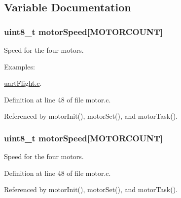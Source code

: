 \subsection{Variable Documentation}
\hypertarget{group__motor_ga0b3c12451554c9ee060319cbe2553d3a}{
\subsubsection[{motor\-Speed}]{\setlength{\rightskip}{0pt plus 5cm}uint8\-\_\-t motor\-Speed\mbox{[}{\bf M\-O\-T\-O\-R\-C\-O\-U\-N\-T}\mbox{]}}}\label{group__motor_ga0b3c12451554c9ee060319cbe2553d3a}


Speed for the four motors. 

\begin{Desc}
\item[Examples\-: ]\par
\hyperlink{uart_flight_8c-example}{uart\-Flight.\-c}.\end{Desc}


Definition at line 48 of file motor.\-c.



Referenced by motor\-Init(), motor\-Set(), and motor\-Task().

\hypertarget{group__motor_ga0b3c12451554c9ee060319cbe2553d3a}{
\subsubsection[{motor\-Speed}]{\setlength{\rightskip}{0pt plus 5cm}uint8\-\_\-t motor\-Speed\mbox{[}{\bf M\-O\-T\-O\-R\-C\-O\-U\-N\-T}\mbox{]}}}\label{group__motor_ga0b3c12451554c9ee060319cbe2553d3a}


Speed for the four motors. 



Definition at line 48 of file motor.\-c.



Referenced by motor\-Init(), motor\-Set(), and motor\-Task().

